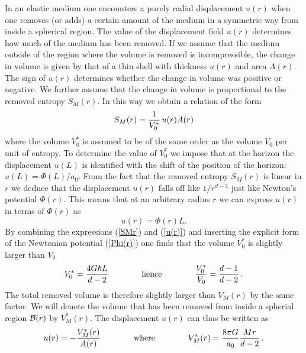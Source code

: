 \documentclass[a4paper,12pt]{article}
\newcommand{\be}{\begin{equation}}
\newcommand{\ee}{\end{equation}}
\begin{document}
In an elastic medium one encounters a purely radial displacement $u(r)$ when one removes (or adds) a certain amount of the medium in a symmetric way from inside a spherical region. 
The value of the displacement field $u(r)$ determines how much of the medium has been removed. If we assume that the medium outside of the region where the volume is removed is incompressible, the change in volume is given by that of a thin shell with thickness $u(r)$ and area $A(r)$. The sign of $u(r)$ determines whether the change in volume was positive or negative. 
We further assume that the change in volume is proportional to the removed entropy $S_M(r)$.  In this way we obtain a relation of the form
\be
\label{removedvolume}
S_M(r) ={1\over V^*_0} \, u(r)A(r)%
\ee
where the volume $V_0^*$ is assumed to be of the same order as the volume $V_0$ per unit of 
entropy. To determine the value of $V_0^*$ we impose that at the horizon the displacement $u(L)$ is 
identified with the shift of the position of the horizon: $u(L) =\Phi(L)/ a_0$.   
From the fact that the removed entropy $S_M(r)$ is linear in $r$ we deduce that the displacement $u(r)$ falls off like $1/r^{d-3}$ just like Newton's potential $\Phi(r)$. This means that at an arbitrary radius $r$ we can express $u(r)$ in terms of $\Phi(r)$ as
\be
\label{u(r)}
u(r) = {\Phi(r)L}.
\ee
By combining the expressions (\ref{SMr}) and (\ref{u(r)}) and inserting the explicit form of the 
Newtonian potential (\ref{Phi(r)}) one finds that the volume $V_0^*$ is slightly larger than $V_0$
\be
\label{d-1/d-2}
V_0^*= {4G\hbar L \over d-2}\qquad\qquad\mbox{hence}\qquad \qquad {V_0^*\over V_0} = %
{d -1\over d- 2}\, . %
\ee
The total removed volume is therefore slightly larger than $V_M(r)$ by the same factor.
We will denote the volume that has been removed from inside a spherial region ${\cal B}(r)$
by $V_M^*(r)$. 
The displacement $u(r)$ can thus be written  as
\begin{equation}
\label{urV}
u(r) = -{V_M^*(r)\over A(r)}	\qquad\qquad\mbox{where}\qquad\qquad
V^*_M(r) = {8\pi G \over a_0} {M r\over d-2} \, .
\end{equation}
\end{document}
